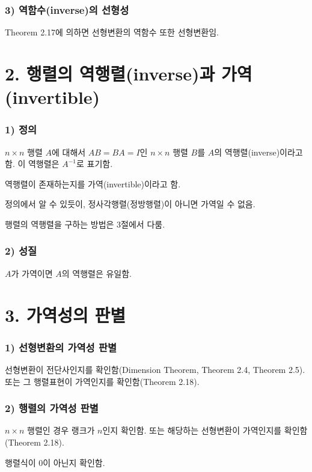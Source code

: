 \subsubsection*{3) 역함수(inverse)의 선형성}
Theorem 2.17에 의하면 선형변환의 역함수 또한 선형변환임.\\


\section*{2. 행렬의 역행렬(inverse)과 가역(invertible)}
\subsubsection*{1) 정의\\}
\begin{DEF}
$n \times n$ 행렬 $A$에 대해서 $AB=BA=I$인 $n \times n$ 행렬 $B$를 $A$의 역행렬(inverse)이라고 함. 이 역행렬은 $A^{-1}$로 표기함.

역행렬이 존재하는지를 가역(invertible)이라고 함.
\end{DEF}

정의에서 알 수 있듯이, 정사각행렬(정방행렬)이 아니면 가역일 수 없음.

행렬의 역행렬을 구하는 방법은 3절에서 다룸.

\subsubsection*{2) 성질}
$A$가 가역이면 $A$의 역행렬은 유일함.\\


\section*{3. 가역성의 판별}
\subsubsection*{1) 선형변환의 가역성 판별}
선형변환이 전단사인지를 확인함(Dimension Theorem, Theorem 2.4, Theorem 2.5). 또는 그 행렬표현이 가역인지를 확인함(Theorem 2.18).

\subsubsection*{2) 행렬의 가역성 판별}
$n \times n$ 행렬인 경우 랭크가 $n$인지 확인함. 또는 해당하는 선형변환이 가역인지를 확인함(Theorem 2.18).

행렬식이 0이 아닌지 확인함.


